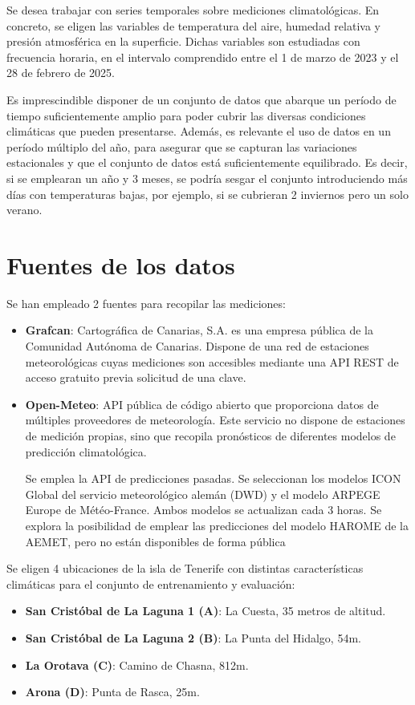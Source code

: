 
Se desea trabajar con series temporales sobre mediciones climatológicas. 
En concreto, se eligen las variables de temperatura del aire, humedad relativa y presión atmosférica en la superficie.
Dichas variables son estudiadas con frecuencia horaria, en el intervalo comprendido entre el 1 de marzo de 2023 y el 28 de febrero de 2025.

Es imprescindible disponer de un conjunto de datos que abarque un período de tiempo suficientemente amplio para poder cubrir las diversas condiciones climáticas que pueden presentarse.
Además, es relevante el uso de datos en un período múltiplo del año, para asegurar que se capturan las variaciones estacionales y que el conjunto de datos está suficientemente equilibrado.
Es decir, si se emplearan un año y 3 meses, se podría sesgar el conjunto introduciendo más días con temperaturas bajas, por ejemplo, si se cubrieran 2 inviernos pero un solo verano.

\section{Fuentes de los datos}

Se han empleado 2 fuentes para recopilar las mediciones: 
\begin{itemize}
    \item \textbf{Grafcan}: Cartográfica de Canarias, S.A. es una empresa pública de la Comunidad Autónoma de Canarias. Dispone de una red de estaciones meteorológicas cuyas
    mediciones son accesibles mediante una API REST de acceso gratuito previa solicitud de una clave\cite{grafcan_sensores}. 
    \item \textbf{Open-Meteo}: API pública de código abierto que proporciona datos de múltiples proveedores de meteorología. Este servicio no dispone de estaciones de medición
    propias, sino que recopila pronósticos de diferentes modelos de predicción climatológica. 

    Se emplea la API de predicciones pasadas\cite{open_meteo_api}. Se seleccionan los modelos ICON Global del servicio meteorológico alemán (DWD) y el modelo ARPEGE Europe de Météo-France. Ambos modelos se actualizan cada 3 horas. 
    Se explora la posibilidad de emplear las predicciones del modelo HAROME de la AEMET, pero no están disponibles de forma pública
\end{itemize}

Se eligen 4 ubicaciones de la isla de Tenerife con distintas características climáticas para el conjunto de entrenamiento y evaluación:
\begin{itemize}
    \item \textbf{San Cristóbal de La Laguna 1 (A)}: La Cuesta, 35 metros de altitud.
    \item \textbf{San Cristóbal de La Laguna 2 (B)}: La Punta del Hidalgo, 54m.
    \item \textbf{La Orotava (C)}: Camino de Chasna, 812m.
    \item \textbf{Arona (D)}: Punta de Rasca, 25m.
\end{itemize}

